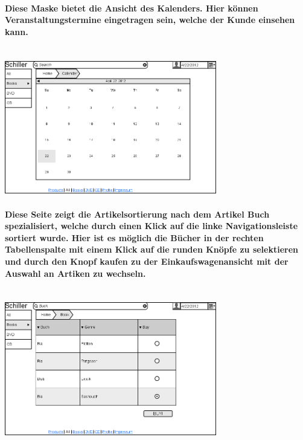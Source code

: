 \documentclass[a4paper]{article}
\begin{document}
\paragraph{Diese Maske bietet die Ansicht des Kalenders. Hier können Veranstaltungstermine eingetragen sein, welche der Kunde einsehen kann.\\ \\}
\includegraphics[width=350px]{6CalenderView.png}

\paragraph{Diese Seite zeigt die Artikelsortierung nach dem Artikel Buch spezialisiert, welche durch einen Klick auf die linke Navigationsleiste sortiert wurde. Hier ist es möglich die Bücher in der rechten Tabellenspalte mit einem Klick auf die runden Knöpfe zu selektieren und durch den Knopf kaufen zu der Einkaufswagenansicht mit der Auswahl an Artiken zu wechseln.\\ \\}
\includegraphics[width=350px]{7bookSearch.png}
\end{document}
